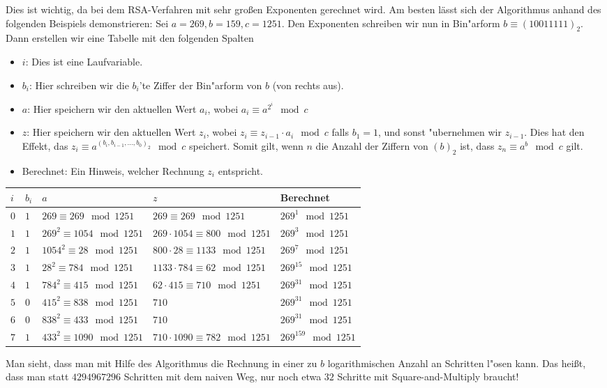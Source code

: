 \documentclass[11pt]{article}
\begin{document}
Dies ist wichtig, da bei dem RSA-Verfahren mit sehr gro{\ss}en Exponenten gerechnet wird. Am besten l\"asst sich
der Algorithmus anhand des folgenden Beispiels demonstrieren: 
Sei $a=269, b=159, c=1251$. Den Exponenten schreiben wir nun in Bin"arform $b \equiv (10011111)_2$. Dann erstellen wir
eine Tabelle mit den folgenden Spalten
\begin{itemize}
    \item $i$: Dies ist eine Laufvariable.\\
    \item $b_i$: Hier schreiben wir die $b_i$'te Ziffer der Bin"arform von $b$ (von rechts aus).\\
    \item $a$: Hier speichern wir den aktuellen Wert $a_i$, wobei $a_i \equiv a^{2^i} \mod c$\\
    \item $z$: Hier speichern wir den aktuellen Wert $z_i$, wobei $z_i \equiv z_{i-1} \cdot a_i \mod c$ falls $b_1 = 1$, und sonst 
        "ubernehmen wir $z_{i-1}$. Dies hat den Effekt, das $z_i \equiv a^{(b_i, b_{i-1}, \ldots, b_0)_2} \mod c$ speichert. Somit gilt,
        wenn $n$ die Anzahl der Ziffern von $(b)_2$ ist, dass $z_n \equiv a^b \mod c$ gilt.
    \item Berechnet: Ein Hinweis, welcher Rechnung $z_i$ entspricht.
\end{itemize}
\begin{center}
    \begin{tabular}{| m{0.2cm} | m{0.2cm}| m{4cm} | m{5cm} | m{3cm} |}
    \hline
        $i$ & $b_i$ & $a$ & $z$ & Berechnet\\
    \hline
    $0$ & $1$ & $269 \equiv 269 \mod 1251$ & $269 \equiv 269 \mod 1251$ & $269^1 \mod 1251$\\
    \hline                                    
    $1$ & $1$ & $269^2 \equiv 1054 \mod 1251$ & $269 \cdot 1054 \equiv 800 \mod 1251$& $269^3 \mod 1251$\\
    \hline                                    
    $2$ & $1$ & $1054^2 \equiv 28 \mod 1251$ & $800 \cdot 28 \equiv 1133 \mod 1251$& $269^7 \mod 1251$\\
    \hline                                    
        $3$ & $1$ & $28^2 \equiv 784 \mod 1251$ & $1133 \cdot 784 \equiv 62 \mod 1251$& $269^{15} \mod 1251$\\
    \hline                                    
        $4$ & $1$ & $784^2 \equiv 415 \mod 1251$ & $62 \cdot 415 \equiv 710 \mod 1251$& $269^{31} \mod 1251$\\
    \hline                                    
        $5$ & $0$ & $415^2 \equiv 838 \mod 1251$ & $710$& $269^{31} \mod 1251$\\
    \hline                                    
        $6$ & $0$ & $838^2 \equiv 433 \mod 1251$ & $710$& $269^{31} \mod 1251$\\
    \hline                                    
        $7$ & $1$ & $433^2 \equiv 1090 \mod 1251$ & $710 \cdot 1090 \equiv 782 \mod 1251$& $269^{159} \mod 1251$\\
    \hline
\end{tabular}
\end{center}
Man sieht, dass man mit Hilfe des Algorithmus die Rechnung in einer zu $b$ logarithmischen Anzahl an Schritten l"osen kann.
Das hei{\ss}t, dass man statt $4294967296$ Schritten mit dem naiven Weg, nur noch etwa $32$ Schritte mit Square-and-Multiply braucht!
\end{document}
